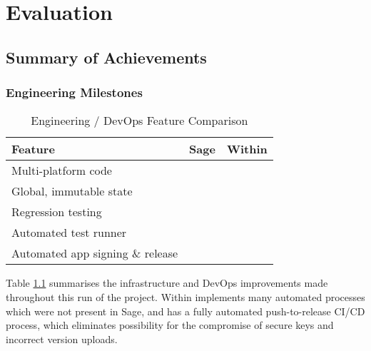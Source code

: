 \chapter{Evaluation}
\section{Summary of Achievements}
\subsection{Engineering Milestones}
\begin{table}[h]
	\begin{tabular}{l|cc}
		Feature                          & Sage & Within     \\
		\hline
		Multi-platform code              &      & \checkmark \\
		Global, immutable state          &      & \checkmark \\
		Regression testing               &      & \checkmark \\
		Automated test runner            &      & \checkmark \\
		Automated app signing \& release &      & \checkmark \\
	\end{tabular}
	\caption{Engineering / DevOps Feature Comparison}
	\label{tab:devops_milestones}
\end{table}

Table \ref{tab:devops_milestones} summarises the infrastructure and DevOps improvements made throughout this run of the project. Within implements many automated processes which were not present in Sage, and has a fully automated push-to-release CI/CD process, which eliminates possibility for the compromise of secure keys and incorrect version uploads.

